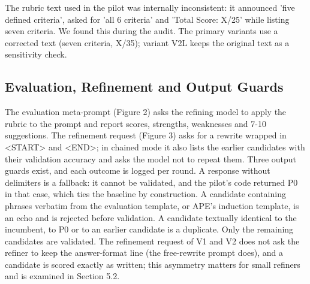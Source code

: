 \documentclass{ieeeaccess}
\begin{document}
The rubric text used in the pilot was internally inconsistent: it announced 'five defined criteria', asked for 'all 6 criteria' and 'Total Score: X/25' while listing seven criteria. We found this during the audit. The primary variants use a corrected text (seven criteria, X/35); variant V2L keeps the original text as a sensitivity check.

\subsection{Evaluation, Refinement and Output Guards}

The evaluation meta-prompt (Figure 2) asks the refining model to apply the rubric to the prompt and report scores, strengths, weaknesses and 7-10 suggestions. The refinement request (Figure 3) asks for a rewrite wrapped in <START> and <END>; in chained mode it also lists the earlier candidates with their validation accuracy and asks the model not to repeat them. Three output guards exist, and each outcome is logged per round. A response without delimiters is a fallback: it cannot be validated, and the pilot's code returned P0 in that case, which ties the baseline by construction. A candidate containing phrases verbatim from the evaluation template, or APE's induction template, is an echo and is rejected before validation. A candidate textually identical to the incumbent, to P0 or to an earlier candidate is a duplicate. Only the remaining candidates are validated. The refinement request of V1 and V2 does not ask the refiner to keep the answer-format line (the free-rewrite prompt does), and a candidate is scored exactly as written; this asymmetry matters for small refiners and is examined in Section 5.2.
\end{document}

